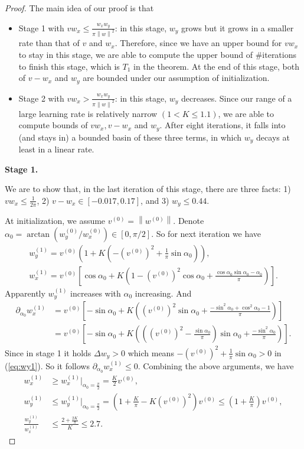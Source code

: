 \documentclass{article}
\theoremstyle{plain}
\theoremstyle{remark}
\newcommand{\norm}[1]{\left\lVert#1\right\rVert}
\newcommand{\T}[1]{^{(#1)}}
\begin{document}
\begin{proof}
The main idea of our proof is that
\begin{itemize}
    \item Stage 1 with $vw_x \le \frac{w_x w_y}{\pi\norm{w}^2}$: in this stage, $w_y$ grows but it grows in a smaller rate than that of $v$ and $w_x$. Therefore, since we have an upper bound for $v w_x$ to stay in this stage, we are able to compute the upper bound of $\#$iterations to finish this stage, which is $T_1$ in the theorem. At the end of this stage, both of $v-w_x$ and $w_y$ are bounded under our assumption of initialization.
    \item Stage 2 with $vw_x > \frac{w_x w_y}{\pi\norm{w}^2}$: in this stage, $w_y$ decreases. Since our range of a large learning rate is relatively narrow $(1<K\le 1.1)$, we are able to compute bounds of $v w_x, v-w_x$ and $w_y$. After eight iterations, it falls into (and stays in) a bounded basin of these three terms, in which $w_y$ decays at least in a linear rate.
\end{itemize}

{\centerline{\large{\textbf{Stage 1.}}}}

We are to show that, in the last iteration of this stage, there are three facts: 1) $v w_x\le \frac{1}{2\pi}$, 2) $v-w_x\in[-0.017, 0.17]$, and 3) $w_y\le0.44$.

At initialization, we assume $v^{(0)}=\norm{w^{(0)}}$. Denote $\alpha_0=\arctan(w_y^{(0)}/w_x^{(0)})\in[0,\pi/2]$. So for next iteration we have
\begin{gather}
    w_y\T{1}=v\T{0}\left(1+K\left(-(v\T{0})^2+\frac{1}{\pi}\sin\alpha_0\right)\right),\label{eq:wy1}\\
    w_x\T{1}=v\T{0}\left[\cos\alpha_0+K\left(1-(v\T{0})^2 \cos\alpha_0+\frac{\cos\alpha_0 \sin\alpha_0 - \alpha_0}{\pi}\right)\right].
\end{gather}
Apparently $w_y\T{1}$ increases with $\alpha_0$ increasing. And
\begin{align*}
    \partial_{\alpha_0} w_x\T{1} &= v\T{0}\left[-\sin\alpha_0+K\left((v\T{0})^2 \sin\alpha_0+\frac{-\sin^2\alpha_0+\cos^2\alpha_0 - 1}{\pi}\right)\right] \\
    &= v\T{0}\left[-\sin\alpha_0+K\left(\left((v\T{0})^2-\frac{\sin\alpha_0}{\pi}\right) \sin\alpha_0+\frac{-\sin^2\alpha_0}{\pi}\right)\right] .
\end{align*}
Since in stage 1 it holds $\Delta w_y>0$ which means $-(v\T{0})^2+\frac{1}{\pi}\sin\alpha_0>0$ in (\ref{eq:wy1}). So it follows $\partial_{\alpha_0} w_x\T{1}\le 0$. Combining the above arguments, we have
\begin{align*}
    w_x\T{1} &\ge w_x\T{1}|_{\alpha_0=\frac{\pi}{2}} = \frac{K}{2}v\T{0}, \\
    w_y\T{1} &\le w_y\T{1}|_{\alpha_0=\frac{\pi}{2}} = \left(1+\frac{K}{\pi}-K(v\T{0})^2\right) v\T{0}\le \left(1+\frac{K}{\pi}\right) v\T{0},\\
    \frac{w_y\T{1}}{w_x\T{1}} &\le \frac{2+\frac{2K}{\pi}}{K} \le 2.7.
\end{align*}


\end{proof}
\end{document}
